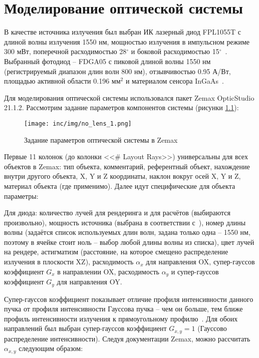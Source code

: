 \chapter{Моделирование оптической системы}

В качестве источника излучения был выбран ИК лазерный диод FPL1055T с длиной волны излучения 1550 нм, мощностью излучения в импульсном режиме 300 мВт, поперечной расходимостью 28${}^\circ$ и боковой расходимостью 15${}^\circ$~\cite{LDThorlabs}. Выбранный фотодиод \--- FDGA05 с пиковой длиной волны 1550 нм (регистрируемый диапазон длин волн 800 нм), отзывчивостью 0.95 А/Вт, площадью активной области 0.196 мм${}^2$ и материалом сенсора InGaAs~\cite{PDThorlabs}.

Для моделирования оптической системы использовался пакет Zemax OpticStudio 21.1.2. Рассмотрим задание параметров компонентов системы (рисунки \ref{fig:no_lens_zemax_1}):

\begin{figure}[!h]
    \centering
    \texttt{[image: inc/img/no\_lens\_1.png]}
    \caption{Задание параметров оптической системы в Zemax}
    \label{fig:no_lens_zemax_1}
\end{figure}

Первые 11 колонок (до колонки <<\# Layout Rays>>) универсальны для всех объектов в Zemax: тип объекта, комментарий, референтный объект, нахождение внутри другого объекта, X, Y и Z координаты, наклон вокруг осей X, Y и Z, материал объекта (где применимо). Далее идут специфические для объекта параметры:

Для диода: количество лучей для рендеринга и для расчётов (выбираются произвольно), мощность источника (выбрана в соответствии с~\cite{LDThorlabs}), номер длины волны (задаётся список используемых длин волн, задана только одна \--- 1550 нм, поэтому в ячейке стоит ноль \--- выбор любой длины волны из списка), цвет лучей на рендере, астигматизм (расстояние, на которое смещено распределение излучения в плоскости XZ), расходимость $\alpha_x$ для направления OX, супер-гауссов коэффициент $G_x$ в направлении OX, расходимость $\alpha_y$ и супер-гауссов коэффициент $G_y$ для направления OY. 

Супер-гауссов коэффициент показывает отличие профиля интенсивности данного пучка от профиля интенсивности Гауссова пучка \--- чем он больше, тем ближе профиль интенсивности излучения к прямоугольному профилю~\cite{Paschotta2008}. Для обоих направлений был выбран супер-гауссов коэффициент $G_{x,y} = 1$ (Гауссово распределение интенсивности). Следуя документации Zemax, можно рассчитать $\alpha_{x,y}$ следующим образом: 

